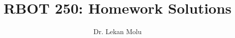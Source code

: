 \documentclass[10 pt, twoside]{IEEEtran}
\title{RBOT 250: Homework Solutions}
\author{Dr. Lekan Molu}
\theoremstyle{remark}
\theoremstyle{definition}
\begin{document}
	\maketitle
	





\providecommand\BIBentryALTinterwordstretchfactor{2.5}

	
\end{document}

